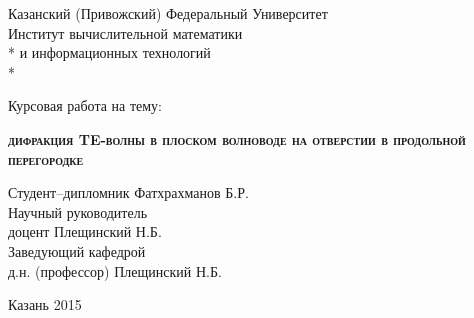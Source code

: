 \begin{titlepage}
\newpage

\begin{center}
Казанский (Привожский) Федеральный Университет \\
\vspace{1cm}
Институт вычислительной математики \\*
и информационных технологий \\*
\hrulefill
\end{center}


\vspace{8em}

\begin{center}
\Large Курсовая работа на тему:
\end{center}

\vspace{2.5em}

\begin{center}
\textsc{\textbf{дифракция TE-волны в плоском волноводе \linebreak на отверстии в продольной перегородке}}
\end{center}

\vspace{6em}

\begin{flushleft}
Студент--дипломник \hrulefill Фатхрахманов Б.Р. \\
\vspace{1.5em}
Научный руководитель \\
доцент \hrulefill  Плещинский Н.Б.\\
\vspace{1.5em}
Заведующий кафедрой \\
д.н. (профессор) \hrulefill Плещинский Н.Б.
\end{flushleft}
\vspace{\fill}

\begin{center}
Казань 2015
\end{center}
\end{titlepage}
